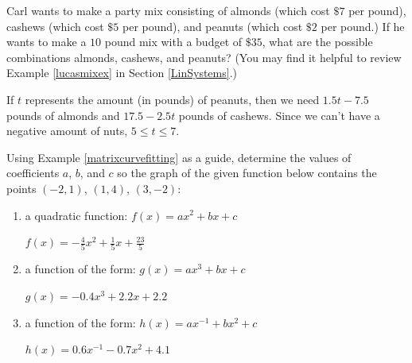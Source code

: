 \documentclass{ximera}
\begin{document}
\begin{problem}
Carl wants to make a party mix consisting of almonds (which cost $\$7$ per pound), cashews (which cost $\$5$ per pound), and peanuts (which cost $\$2$ per pound.)  If he wants to make a $10$ pound mix with a budget of $\$35$, what are the possible combinations almonds, cashews, and peanuts?  (You may find it helpful to review Example \ref{lucasmixex} in Section \ref{LinSystems}.)

\begin{solution}
If $t$ represents the amount (in pounds) of peanuts, then we need $1.5 t - 7.5$ pounds of almonds and $17.5 - 2.5t$ pounds of cashews.  Since we can't have a negative amount of nuts, $5 \leq t \leq 7$.
\end{solution}
\end{problem} 

\begin{problem}\label{threepointsmatrixfunctionfitex}

Using Example \ref{matrixcurvefitting} as a guide,  determine the values of coefficients $a$, $b$, and $c$ so the graph of the given function below contains the points $(-2,1)$, $(1,4)$, $(3,-2)$:

\begin{enumerate}

\item a quadratic function: $f(x) = ax^2+bx+c$

\begin{solution}
$f(x) = -\frac{4}{5} x^2+\frac{1}{5} x + \frac{23}{5}$
\end{solution}

\item  a function of the form: $g(x) = ax^3+bx+c$ 

\begin{solution}
$g(x) = -0.4 x^3 + 2.2 x + 2.2$
\end{solution}

\item a function of the form:  $h(x) = ax^{-1}+bx^2+c$

\begin{solution}
$h(x) = 0.6 x^{-1} - 0.7 x^2 + 4.1$
\end{solution}

\end{enumerate}
\end{problem}
 
\end{document}
